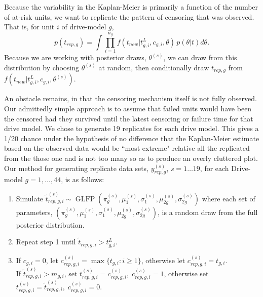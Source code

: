 \documentclass[12pt]{article}
\newcommand{\op}{\operatorname}
\begin{document}


Because the variability in the Kaplan-Meier is primarily a function of the number of at-risk units, we want to replicate the pattern of censoring that was observed. That is, for unit $i$ of drive-model $g$,
$$p(t_{rep,g}) = \int \prod_{i=1}^{n_g}f(t_{new}|t_{g,i}^L,c_{g,i},\theta)\,p(\theta|t)d\theta.$$
Because we are working with posterior draws, $\theta^{(s)}$, we can draw from this distribution by choosing $\theta^{(s)}$ at random, then conditionally draw $t_{rep,g}$ from $f(t_{new}|t_{g,i}^L,c_{g,i},\theta^{(s)}).$

An obstacle remains, in that the censoring mechanism itself is not fully observed. Our admittedly simple approach is to assume that failed units would have been the censored had they survived until the latest censoring or failure time for that drive model. We chose to generate 19 replicates for each drive model. This gives a 1/20 chance under the hypothesis of no difference that the Kaplan-Meier estimate based on the observed data would be ``most extreme" relative all the replicated  from the those one and is not too many so as to produce an overly cluttered plot. Our method for generating replicate data sets, $y_{rep,g}^{(s)}$, $s = 1 \dots 19$, for each Drive-model $g=1,\ldots,44$, is as follows:
\begin{enumerate}
\item Simulate $\tilde{t}_{rep,g,i}^{(s)} \sim \op{GLFP}(\pi_{g}^{(s)},\mu_1^{(s)},\sigma_1^{(s)},\mu_{2g}^{(s)}, \sigma_{2g}^{(s)})$ where each set of parameters, $\left( \pi_{g}^{(s)},\mu_1^{(s)},\sigma_1^{(s)},\mu_{2g}^{(s)}, \sigma_{2g}^{(s)} \right) $, is a random draw from the full posterior distribution.
\item Repeat step 1 until $\tilde{t}_{rep,g,i} > t_{g,i}^L$.
\item If $c_{g,i}=0$, let $c_{rep,g,i}^{(s)}=\max \{t_{g,i}: i \ge 1\}$, otherwise let $c_{rep,g,i}^{(s)}=t_{g,i}$.\\
If $\tilde{t}_{rep,g,i}^{(s)}>m_{g,i}$, set $t_{rep,g,i}^{(s)}=c_{rep,g,i}^{(s)},\; c_{rep,g,i}^{(s)}=1$, otherwise set $t_{rep,g,i}^{(s)}=\tilde{t}_{rep,g,i}^{(s)},\; c_{rep,g,i}^{(s)}=0$.
\end{enumerate}
\end{document}
